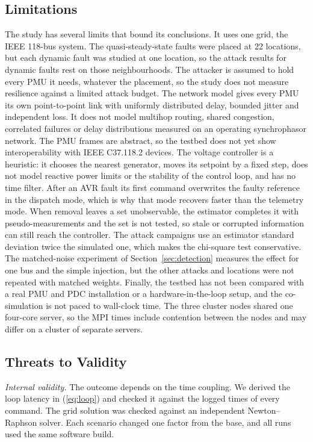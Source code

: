 \documentclass[journal]{IEEEtran}
\begin{document}
\subsection{Limitations}

The study has several limits that bound its conclusions. It uses one grid, the IEEE 118-bus system. The quasi-steady-state faults were placed at 22 locations, but each dynamic fault was studied at one location, so the attack results for dynamic faults rest on those neighbourhoods. The attacker is assumed to hold every PMU it needs, whatever the placement, so the study does not measure resilience against a limited attack budget. The network model gives every PMU its own point-to-point link with uniformly distributed delay, bounded jitter and independent loss. It does not model multihop routing, shared congestion, correlated failures or delay distributions measured on an operating synchrophasor network. The PMU frames are abstract, so the testbed does not yet show interoperability with IEEE C37.118.2 devices. The voltage controller is a heuristic: it chooses the nearest generator, moves its setpoint by a fixed step, does not model reactive power limits or the stability of the control loop, and has no time filter. After an AVR fault its first command overwrites the faulty reference in the dispatch mode, which is why that mode recovers faster than the telemetry mode. When removal leaves a set unobservable, the estimator completes it with pseudo-measurements and the set is not tested, so stale or corrupted information can still reach the controller. The attack campaigns use an estimator standard deviation twice the simulated one, which makes the chi-square test conservative. The matched-noise experiment of Section~\ref{sec:detection} measures the effect for one bus and the simple injection, but the other attacks and locations were not repeated with matched weights. Finally, the testbed has not been compared with a real PMU and PDC installation or a hardware-in-the-loop setup, and the co-simulation is not paced to wall-clock time. The three cluster nodes shared one four-core server, so the MPI times include contention between the nodes and may differ on a cluster of separate servers.

\subsection{Threats to Validity}

\emph{Internal validity.} The outcome depends on the time coupling. We derived the loop latency in (\ref{eq:loop}) and checked it against the logged times of every command. The grid solution was checked against an independent Newton--Raphson solver. Each scenario changed one factor from the base, and all runs used the same software build.
\end{document}
